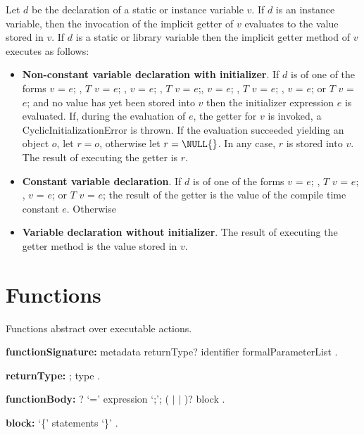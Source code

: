 \documentclass{article}
\newcommand{\code}[1]{{\sf #1}}
\begin{document}
\LMHash{}
Let $d$ be the declaration of a static or instance variable $v$.  If $d$ is an instance variable, then the invocation of the implicit getter  of $v$ evaluates to the value stored in $v$.
If $d$ is a static or library variable then the implicit getter method of $v$ executes as follows: 
\begin{itemize}
\item {\bf Non-constant variable declaration with initializer}. If $d$ is of one of the forms \code{\VAR{} $v$ = $e$;} ,  \code{$T$ $v$ = $e$;} ,   \code{\FINAL{} $v$ = $e$;} ,  \code{\FINAL{} $T$ $v$ = $e$;}, \code{\STATIC{} $v$ = $e$; }, \code{\STATIC{} $T$ $v$ = $e$; }, \code{\STATIC{} \FINAL{} $v$ = $e$; } or \code{\STATIC{} \FINAL{} $T$ $v$ = $e$;} and no value has yet been stored into $v$ then the initializer expression $e$ is evaluated. If, during the evaluation of $e$, the getter for $v$ is invoked, a \code{CyclicInitializationError} is thrown. If the evaluation succeeded yielding an object $o$, let $r = o$, otherwise let $r = \NULL{}$. In any case, $r$ is stored into $v$. The result of executing the getter is $r$. 
\item  {\bf Constant variable declaration}. If $d$ is of one of the forms \code{\CONST{} $v$ = $e$; } ,  \code{\CONST{} $T$  $v$ = $e$; },  \code{\STATIC{} \CONST{} $v$ = $e$; }  or \code{\STATIC{} \CONST{} $T$ $v$ = $e$;} the result of the getter is the value of the compile time constant $e$.  
Otherwise
\item {\bf Variable declaration without initializer}. The result of executing the getter method is the value stored in $v$.  
\end{itemize}





\section{Functions}

\LMHash{}
Functions abstract over executable actions.

\begin{grammar}
{\bf functionSignature:}
    metadata returnType? identifier formalParameterList
    .
    
{\bf returnType:}
      \VOID{};
      type
    .

{\bf functionBody:} \ASYNC{}?  `={\escapegrammar \gt}' expression `{\escapegrammar ;}';
     (\ASYNC{} $|$ \ASYNC* $|$ \SYNC*)? block
    .

{\bf block:}
      `\{' statements `\}'
    .

\end{grammar}
\end{document}
